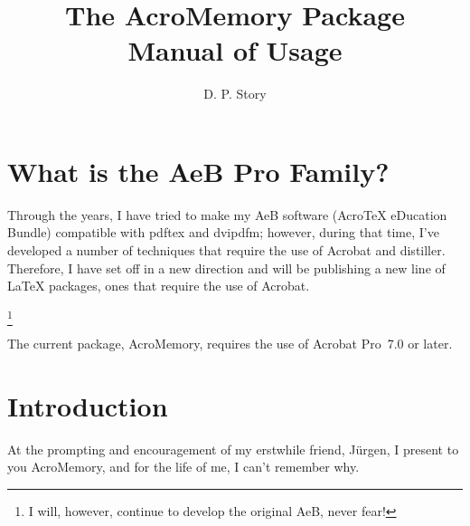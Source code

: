 \documentclass{article}
\title{The AcroMemory Package\texorpdfstring{\\}{: }Manual of Usage}
\author{D. P. Story}
\def\nhfootnote#1{\begin{NoHyper}\footnote{#1}\end{NoHyper}}
\begin{document}

\maketitle



\tableofcontents



\section{What is the AeB Pro Family?}

  Through the years, I have tried to make my AeB software
  ({Acro\negthinspace\TeX} eDucation Bundle) compatible with
  \textsf{pdftex} and \textsf{dvipdfm}; however, during that time,
  I've developed a number of techniques that require the use of
  Acrobat and distiller. Therefore, I have set off in a new
  direction and will be publishing a new line of {\LaTeX} packages,
  ones that require the use of Acrobat.\nhfootnote{I will, however,
  continue to develop the original AeB, never fear!}

\newtopic The current package, \textsf{AcroMemory}, requires the use
          of Acrobat Pro~7.0 or later.

\section{Introduction}

At the prompting and encouragement of my erstwhile friend,
J\"{u}rgen, I present to you \textsf{AcroMemory}, and for the life
of me, I can't remember why.
\end{document}
